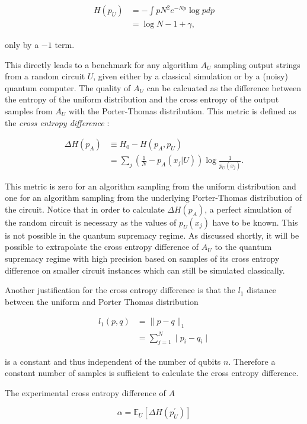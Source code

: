 \begin{align}
  H(p_U) &= - \int p N^2e^{-Np}\log{p} dp \\
         &= \log{N} -1 + \gamma,
\end{align}

only by a $-1$ term. 

This directly leads to a benchmark for any algorithm $A_U$ sampling output strings from a
random circuit $U$, given either by a
classical simulation or by a (noisy) quantum computer. The quality of 
$A_U$ can be calcuated as the difference between
the entropy of the uniform distribution and the cross entropy of the output
samples from $A_U$ with the Porter-Thomas distribution. This metric is
defined as the \textit{cross entropy difference} \cite{Boixo2018supremacy}:

\begin{align}
  \Delta H(p_A) &\equiv H_0 - H(p_A, p_U) \\
                 &=\sum_j (\frac{1}{N} - p_A(x_j|U))\log{\frac{1}{p_U(x_j)}}.
\end{align}

This metric is zero for an algorithm sampling from the uniform
distribution and one for an algorithm sampling from the underlying Porter-Thomas
distribution of the circuit.
Notice that in order to calculate $\Delta H(p_A)$, 
a perfect simulation of the random circuit is necessary 
as the values of $p_U(x_j)$ have to be known. This is not possible in the quantum
supremacy regime. As discussed shortly, it will be possible
to extrapolate the cross entropy difference of $A_U$ to the quantum supremacy regime with high
precision based on samples of its cross entropy difference on smaller circuit
instances which can still be simulated classically.

Another justification for the cross entropy difference is that the $l_1$ distance between the uniform and Porter Thomas distribution

\begin{align}
  l_1(p,q) &= \| p-q\|_1 \\
           &= \sum_{j=1}^N \mid p_i - q_i \mid
\end{align}

is a constant and thus independent of the number of qubits $n$. Therefore a
constant number of samples is sufficient to calculate the cross entropy
difference.

The experimental cross entropy difference of $A$

\begin{equation}
  \alpha = \mathbb{E}_U[\Delta H(p^{\prime}_U)]
\end{equation}

